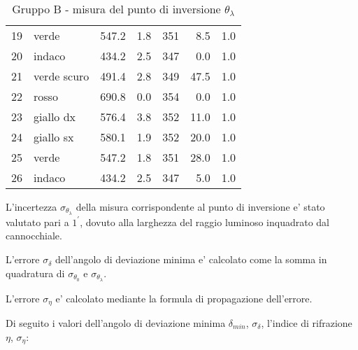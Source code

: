 \begin{table}[!htbp]
{\begin{tabular}{clcccrr}
            19  &   verde        &   547.2  & 1.8 &  351 &   8.5   & 1.0  \\
            20  &   indaco       &   434.2  & 2.5 &  347 &   0.0   & 1.0  \\
            21  &   verde scuro  &   491.4  & 2.8 &  349 &   47.5  & 1.0  \\
            22  &   rosso        &   690.8  & 0.0 &  354 &   0.0   & 1.0  \\
            23  &   giallo dx    &   576.4  & 3.8 &  352 &   11.0  & 1.0  \\
            24  &   giallo sx    &   580.1  & 1.9 &  352 &   20.0  & 1.0  \\
            25  &   verde        &   547.2  & 1.8 &  351 &   28.0  & 1.0  \\
            26  &   indaco       &   434.2  & 2.5 &  347 &   5.0   & 1.0  \\
        \hline
    \end{tabular}
    \par}
    \caption{Gruppo B - misura del punto di inversione $\theta_{\lambda}$}
\end{table}

L'incertezza $\sigma_{\theta_{\lambda}}$ della misura corrispondente al punto di inversione e' stato valutato pari a $1^{\prime}$, dovuto alla larghezza del raggio luminoso inquadrato dal cannocchiale. 

L'errore $\sigma_{\delta}$ dell'angolo di deviazione minima e' calcolato come la somma in quadratura di $\sigma_{\theta_0}$ e $\sigma_{\theta_{\lambda}}$.

L'errore $\sigma_{\eta}$ e' calcolato mediante la formula di propagazione dell'errore.

Di seguito i valori dell'angolo di deviazione minima $\delta_{min}$, $\sigma_{\delta}$, l'indice di rifrazione $\eta$, $\sigma_{\eta}$:

